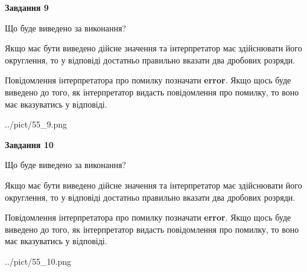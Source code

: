 \documentclass[12pt, ukrainian]{article}
\begin{document}
{\begin {Large}
{\begin {center}\textbf{Завдання 9}\end {center}}\par
Що буде виведено за виконання? \par

Якщо має бути виведено дійсне значення та інтерпретатор має здійснювати його округлення, 
то у відповіді достатньо правильно вказати два дробових розряди.

Повідомлення інтерпретатора про помилку позначати \textbf{error}.
Якщо щось буде виведено до того, як інтерпретатор видасть повідомлення про помилку, 
то воно має вказуватись у відповіді. \par

\begin{center}
	{../pict/55_9.png}
\end{center}
\newpage

{\begin {center}\textbf{Завдання 10}\end {center}}\par
Що буде виведено за виконання? \par

Якщо має бути виведено дійсне значення та інтерпретатор має здійснювати його округлення, 
то у відповіді достатньо правильно вказати два дробових розряди.

Повідомлення інтерпретатора про помилку позначати \textbf{error}.
Якщо щось буде виведено до того, як інтерпретатор видасть повідомлення про помилку, 
то воно має вказуватись у відповіді. \par

\begin{center}
	{../pict/55_10.png}
\end{center}
\newpage

\end {Large}}
\end{document}
